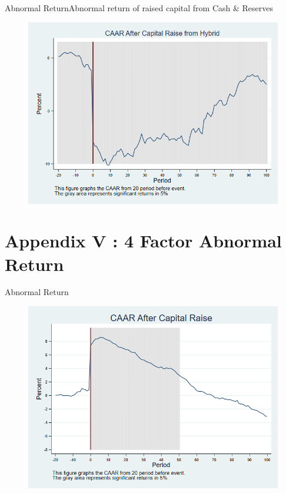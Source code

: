 \documentclass{beamer}
\begin{document}
\begin{frame}{Abnormal Return}{Abnormal return of raised capital from Cash \& Reserves}
	\label{car_marketmodel_industryHybrid}
	\begin{figure}
		\centering
		\includegraphics[width=0.65\linewidth]{Output/car_marketmodel_industryHybrid.png}
		\label{fig:car_marketmodel_industryHybrid}
	\end{figure}
\end{frame}




\section{Appendix V : 4 Factor Abnormal Return}
\begin{frame}{Abnormal Return}
\label{abreturn4Factor}
\begin{figure}
\centering
\includegraphics[width=0.7\linewidth]{AbReturn_4Factor.png}
\label{fig:abreturn2}
\end{figure}
\hfill\hyperlink{abreturn}{}
\end{frame}
\end{document}
